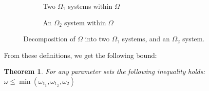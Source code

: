 \documentclass{article}
\newtheorem{theorem}{Theorem}
\numberwithin{equation}{section}
\begin{document}
\begin{figure}[!htbp]
\begin{center}
\begin{subfigure}[b]{0.85\textwidth}
  
  \caption{Two $\Omega_1$ systems within $\Omega$}
  \label{fig:omega1swithinomega}
\end{subfigure}
\end{center}
\vspace{12mm}
\begin{center}
\begin{subfigure}[b]{0.85\textwidth}
  
  \caption{An $\Omega_2$ system within $\Omega$}
  \label{fig:omega2withinomega}
\end{subfigure}
\end{center}
\caption{Decomposition of $\Omega$ into two $\Omega_1$ systems, and an
$\Omega_2$ system.}
\label{fig:decomposeqnet}
\end{figure}


From these definitions, we get the following bound:

\begin{theorem}\label{thrm:bound}
For any parameter sets the following inequality holds:
$\omega \leq \min(\omega_{1_1}, \omega_{1_2}, \omega_2)$
\end{theorem}
\end{document}
